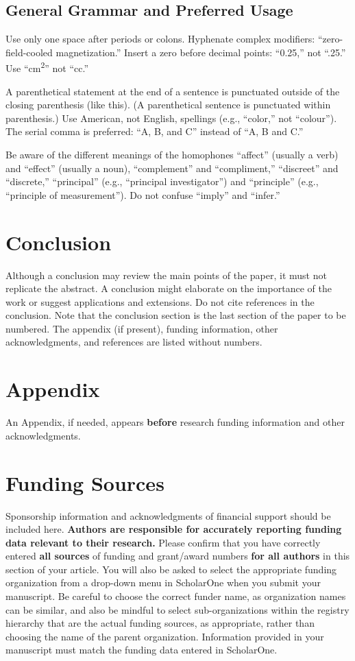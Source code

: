 \documentclass[journal]{new-aiaa}
\begin{document}
\subsection{General Grammar and Preferred Usage}
Use only one space after periods or colons. Hyphenate complex modifiers: ``zero-field-cooled magnetization.'' Insert a zero before decimal points: ``0.25,'' not ``.25.'' Use ``\si{\centi\meter\squared}'' not ``cc.'' 

A parenthetical statement at the end of a sentence is punctuated outside of the closing parenthesis (like this). (A parenthetical sentence is punctuated within parenthesis.) Use American, not English, spellings (e.g., “color,” not “colour”). The serial comma is preferred: “A, B, and C” instead of “A, B and C.”

Be aware of the different meanings of the homophones “affect” (usually a verb) and “effect” (usually a noun), “complement” and “compliment,” “discreet” and “discrete,” “principal” (e.g., “principal investigator”) and “principle” (e.g., “principle of measurement”). Do not confuse “imply” and “infer.”

\section{Conclusion}
Although a conclusion may review the main points of the paper, it must not replicate the abstract. A conclusion might elaborate on the importance of the work or suggest applications and extensions. Do not cite references in the conclusion. Note that the conclusion section is the last section of the paper to be numbered. The appendix (if present), funding information, other acknowledgments, and references are listed without numbers.

\section*{Appendix}

An Appendix, if needed, appears \textbf{before} research funding information and other acknowledgments.

\section*{Funding Sources}

Sponsorship information and acknowledgments of financial support should be included here. \textbf{Authors are responsible for accurately reporting funding data relevant to their research.} Please confirm that you have correctly entered \textbf{all sources} of funding and grant/award numbers \textbf{for all authors} in this section of your article. You will also be asked to select the appropriate funding organization from a drop-down menu in ScholarOne when you submit your manuscript. Be careful to choose the correct funder name, as organization names can be similar, and also be mindful to select sub-organizations within the registry hierarchy that are the actual funding sources, as appropriate, rather than choosing the name of the parent organization. Information provided in your manuscript must match the funding data entered in ScholarOne.
\end{document}
